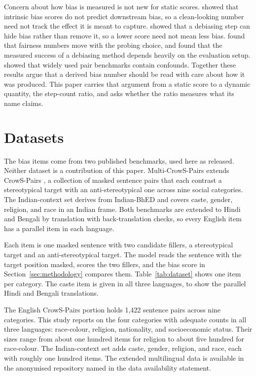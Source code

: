 \documentclass[Afour,sageh,times]{sagej}
\begin{document}
Concern about how bias is measured is not new for static scores. \citet{goldfarbtarrant2021intrinsic} showed that intrinsic bias scores do not predict downstream bias, so a clean-looking number need not track the effect it is meant to capture. \citet{gonen2019lipstick} showed that a debiasing step can hide bias rather than remove it, so a lower score need not mean less bias. \citet{delobelle2022measuring} found that fairness numbers move with the probing choice, and \citet{meade2022empirical} found that the measured success of a debiasing method depends heavily on the evaluation setup. \citet{blodgett2021stereotyping} showed that widely used pair benchmarks contain confounds. Together these results argue that a derived bias number should be read with care about how it was produced. This paper carries that argument from a static score to a dynamic quantity, the step-count ratio, and asks whether the ratio measures what its name claims.

\section{Datasets}
\label{sec:datasets}

The bias items come from two published benchmarks, used here as released. Neither dataset is a contribution of this paper. Multi-CrowS-Pairs extends CrowS-Pairs \citep{nangia2020crowspairs}, a collection of masked sentence pairs that each contrast a stereotypical target with an anti-stereotypical one across nine social categories. The Indian-context set derives from Indian-BhED \citep{khandelwal2023indianbhed} and covers caste, gender, religion, and race in an Indian frame. Both benchmarks are extended to Hindi and Bengali by translation with back-translation checks, so every English item has a parallel item in each language.

Each item is one masked sentence with two candidate fillers, a stereotypical target and an anti-stereotypical target. The model reads the sentence with the target position masked, scores the two fillers, and the bias score in Section~\ref{sec:methodology} compares them. Table~\ref{tab:dataset} shows one item per category. The caste item is given in all three languages, to show the parallel Hindi and Bengali translations.

The English CrowS-Pairs portion holds 1{,}422 sentence pairs across nine categories. This study reports on the four categories with adequate counts in all three languages: race-colour, religion, nationality, and socioeconomic status. Their sizes range from about one hundred items for religion to about five hundred for race-colour. The Indian-context set adds caste, gender, religion, and race, each with roughly one hundred items. The extended multilingual data is available in the anonymised repository named in the data availability statement.
\end{document}
